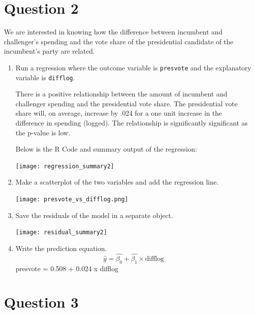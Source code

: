 \documentclass[12pt,letterpaper]{article}
\begin{document}
\newpage

\section*{Question 2}
\noindent We are interested in knowing how the difference between incumbent and challenger's spending and the vote share of the presidential candidate of the incumbent's party are related.	\vspace{.25cm}
	\begin{enumerate}
		\item Run a regression where the outcome variable is \texttt{presvote} and the explanatory variable is \texttt{difflog}.	\vspace{.25cm}
		
		There is a positive relationship between the amount of incumbent and challenger spending and the presidential vote share. The presidential vote share will, on average, increase by .024 for a one unit increase in the difference in spending (logged). The relationship is significantly significant as the p-value is low. 
		
		Below is the R Code and summary output of the regression: 
		
		\texttt{[image: regression\_summary2]}
		
		
		\item Make a scatterplot of the two variables and add the regression line. 	\vspace{.25cm}
		
			\texttt{[image: presvote\_vs\_difflog.png]}
		
		
		\item Save the residuals of the model in a separate object.	\vspace{.25cm}
		
	
		
		\texttt{[image: residual\_summary2]}
		
		\item Write the prediction equation.
		$$\hat{y}= \hat{\beta_0} + \hat{\beta_1} \times \text{difflog}$$
		presvote = 0.508 + 0.024 x difflog
	\end{enumerate}
	
	\newpage	
\section*{Question 3}
\end{document}
